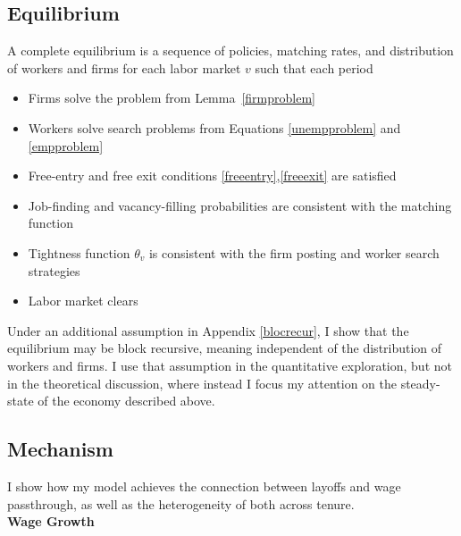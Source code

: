 \subsection{Equilibrium}
A complete equilibrium is a sequence of policies, matching rates, and distribution of workers and firms for each labor market $v$ such that each period
\begin{itemize}
    \item Firms solve the problem from Lemma~\ref{firmproblem}
    \item Workers solve search problems from Equations \ref{unempproblem} and \ref{empproblem}
    \item Free-entry  and free exit conditions \ref{freeentry},\ref{freeexit}  are satisfied
    \item Job-finding and vacancy-filling probabilities are consistent with the matching function
    \item Tightness function $\theta_v$ is consistent with the firm posting and worker search strategies
    \item Labor market clears
\end{itemize}
Under an additional assumption in Appendix \ref{blocrecur}, I show that the equilibrium may be block recursive, meaning independent of the distribution of workers and firms. I use that assumption in the quantitative exploration, but not in the theoretical discussion, where instead I focus my attention on the steady-state of the economy described above.

\subsection{Mechanism}
I show how my model achieves the connection between layoffs and wage passthrough, as well as the heterogeneity of both across tenure. \\
\textbf{Wage Growth}

